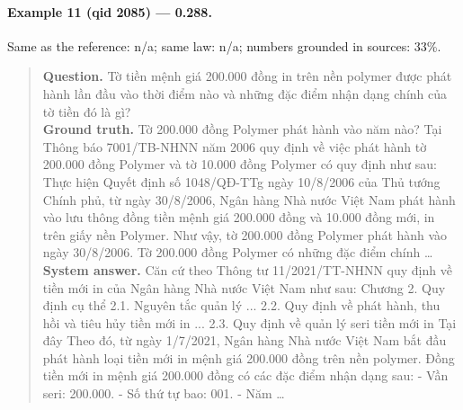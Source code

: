 \paragraph{Example 11 (qid 2085) --- \rl{} 0.288.} Same \dieu{} as the reference: n/a; same law: n/a; numbers grounded in sources: 33\%.
\begin{quote}\small\textbf{Question.} Tờ tiền mệnh giá 200.000 đồng in trên nền polymer được phát hành lần đầu vào thời điểm nào và những đặc điểm nhận dạng chính của tờ tiền đó là gì?\\[2pt]
\textbf{Ground truth.} Tờ 200.000 đồng Polymer phát hành vào năm nào? Tại Thông báo 7001/TB-NHNN năm 2006 quy định về việc phát hành tờ 200.000 đồng Polymer và tờ 10.000 đồng Polymer có quy định như sau: Thực hiện Quyết định số 1048/QĐ-TTg ngày 10/8/2006 của Thủ tướng Chính phủ, từ ngày 30/8/2006, Ngân hàng Nhà nước Việt Nam phát hành vào lưu thông đồng tiền mệnh giá 200.000 đồng và 10.000 đồng mới, in trên giấy nền Polymer. Như vậy, tờ 200.000 đồng Polymer phát hành vào ngày 30/8/2006. Tờ 200.000 đồng Polymer có những đặc điểm chính …\\[2pt]
\textbf{System answer.} Căn cứ theo Thông tư 11/2021/TT-NHNN quy định về tiền mới in của Ngân hàng Nhà nước Việt Nam như sau: Chương 2. Quy định cụ thể 2.1. Nguyên tắc quản lý ... 2.2. Quy định về phát hành, thu hồi và tiêu hủy tiền mới in ... 2.3. Quy định về quản lý seri tiền mới in Tại đây Theo đó, từ ngày 1/7/2021, Ngân hàng Nhà nước Việt Nam bắt đầu phát hành loại tiền mới in mệnh giá 200.000 đồng trên nền polymer. Đồng tiền mới in mệnh giá 200.000 đồng có các đặc điểm nhận dạng sau: - Vần seri: 200.000. - Số thứ tự bao: 001. - Năm …\end{quote}

